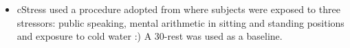 \begin{itemize}
  \item cStress \cite{hovsepian15cstress} used a procedure adopted from
    \cite{plarre11continuous} where subjects were exposed to three
    stressors: public speaking, mental arithmetic in sitting and standing
    positions and exposure to cold water :) A 30-rest was used as a baseline.
\end{itemize}
